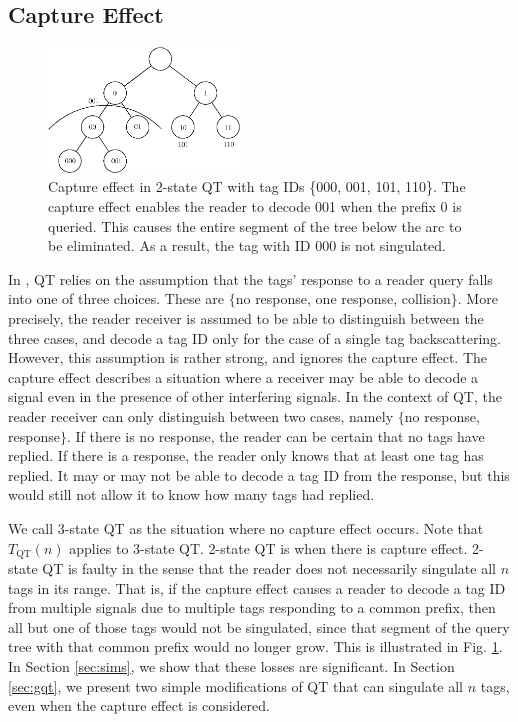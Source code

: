 \documentclass[conference]{IEEEtran}
\begin{document}
\subsection{Capture Effect}
\begin{figure}
\centering
\includegraphics[width=2in]{fig3.eps}
\caption{Capture effect in 2-state QT with tag IDs \{000, 001, 101, 110\}.  The capture effect enables the reader to decode 001 when the prefix 0 is queried.  This causes the entire segment of the tree below the arc to be eliminated.  As a result, the tag with ID 000 is not singulated.  \label{fig:fig3}}
\end{figure}
In \cite{conf:Law01}, QT relies on the assumption that the tags' response to a reader query falls into one of three choices.  These are $\{$no response, one response, collision$\}$.  More precisely, the reader receiver is assumed to be able to distinguish between the three cases, and decode a tag ID only for the case of a single tag backscattering.  However, this assumption is rather strong, and ignores the capture effect.  The capture effect describes a situation where a receiver may be able to decode a signal even in the presence of other interfering signals.  In the context of QT, the reader receiver can only distinguish between two cases, namely $\{$no response, response$\}$.  If there is no response, the reader can be certain that no tags have replied.  If there is a response, the reader only knows that at least one tag has replied.  It may or may not be able to decode a tag ID from the response, but this would still not allow it to know how many tags had replied.

We call 3-state QT as the situation where no capture effect occurs.  Note that $T_{\mbox{QT}}\left(n\right)$ applies to 3-state QT.  2-state QT is when there is capture effect.  2-state QT is faulty in the sense that the reader does not necessarily singulate all $n$ tags in its range.  That is, if the capture effect causes a reader to decode a tag ID from multiple signals due to multiple tags responding to a common prefix, then all but one of those tags would not be singulated, since that segment of the query tree with that common prefix would no longer grow.  This is illustrated in Fig. \ref{fig:fig3}.  In Section \ref{sec:sims}, we show that these losses are significant.  In Section \ref{sec:gqt}, we present two simple modifications of QT that can singulate all $n$ tags, even when the capture effect is considered.
\end{document}
